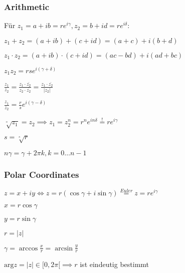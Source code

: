 \subsubsection{Arithmetic}
Für $z_1 = a + ib = re^{i \gamma}, z_2 = b + id = re^{i \delta}$:
\begin{compactitem}
    \item $z_1 + z_2 = (a + ib) + (c + id) = (a + c) + i(b + d)$
    \item $z_1 \cdot z_2 = (a + ib) \cdot (c + id) = (ac - bd) + i(ad + bc)$
        \begin{compactitem}
            \item $z_1 z_2 = rse^{i(\gamma + \delta)}$
        \end{compactitem}
    \item $\frac{z_1}{z_2} = \frac{z_1 \cdot \overline{z_2}}{z_2 \cdot \overline{z_2}}= \frac{z_1 \cdot \overline{z_2}}{|z_2|}$
        \begin{compactitem}
            \item $\frac{z_1}{z_2} = \frac{r}{s}e^{i(\gamma - \delta)}$
        \end{compactitem}
        \item $\sqrt[^n]{z_1} = z_2 \implies z_1 = z_2^n = r^ne^{i n \delta} \overset{!}{=} re^{i\gamma}$
            \begin{compactitem}
                \item $s = \sqrt[^n]{r}$
                \item $n \gamma = \gamma + 2 \pi k, k = 0\dots n - 1$
            \end{compactitem}
\end{compactitem}

\subsubsection{Polar Coordinates}
$z = x + iy \iff z = r(\cos \gamma + i \sin \gamma) \overset{Euler}{=} z = r e^{i \gamma}$
\begin{compactitem}
    \item 
        \begin{inparaitem}
            \item $x = r \cos \gamma$ 
            \item $y = r \sin \gamma$
        \end{inparaitem}
    \item $r = |z|$
    \item $\gamma = \arccos \frac{x}{r} = \arcsin \frac{y}{r}$
    \item $\text{arg}z = |z| \in [0, 2\pi[ \implies r$ ist eindeutig bestimmt
\end{compactitem}
